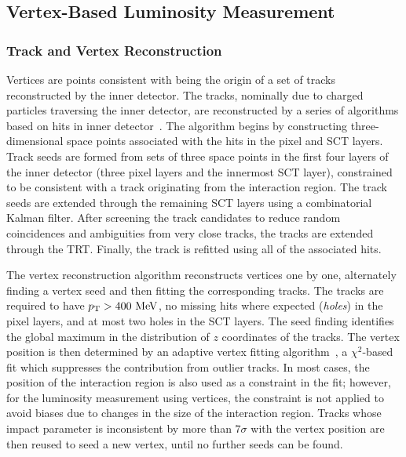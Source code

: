 \subsection{Vertex-Based Luminosity Measurement}

\subsubsection{Track and Vertex Reconstruction}

Vertices are points consistent with being the origin of a set of tracks reconstructed by the inner detector. The tracks, nominally due to charged particles traversing the inner detector, are reconstructed by a series of algorithms based on hits in inner detector~\cite{TheATLASCollaboration:2010vk}. The algorithm begins by constructing three-dimensional space points associated with the hits in the pixel and SCT layers. Track seeds are formed from sets of three space points in the first four layers of the inner detector (three pixel layers and the innermost SCT layer), constrained to be consistent with a track originating from the interaction region. The track seeds are extended through the remaining SCT layers using a combinatorial Kalman filter. After screening the track candidates to reduce random coincidences and ambiguities from very close tracks, the tracks are extended through the TRT. Finally, the track is refitted using all of the associated hits. 

The vertex reconstruction algorithm reconstructs vertices one by one, alternately finding a vertex seed and then fitting the corresponding tracks. The tracks are required to have $\pt>400 \MeV$, no missing hits where expected (\emph{holes}) in the pixel layers, and at most two holes in the SCT layers. The seed finding identifies the global maximum in the distribution of $z$ coordinates of the tracks. The vertex position is then determined by an adaptive vertex fitting algorithm~\cite{Fruhwirth:2007hz}, a $\chi^2$-based fit which suppresses the contribution from outlier tracks. In most cases, the position of the interaction region is also used as a constraint in the fit; however, for the luminosity measurement using vertices, the constraint is not applied to avoid biases due to changes in the size of the interaction region. Tracks whose impact parameter is inconsistent by more than $7\sigma$ with the vertex position are then reused to seed a new vertex, until no further seeds can be found. 

